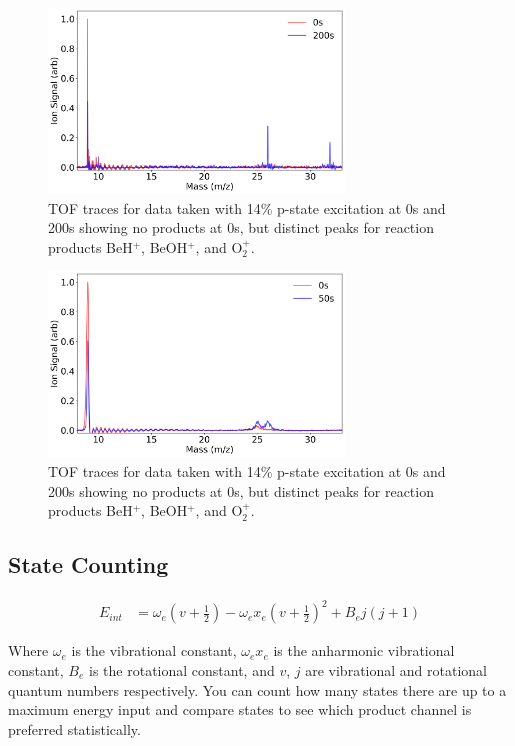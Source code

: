 \documentclass[a4paper]{article}
\begin{document}
\begin{figure}[H]
\centering
\includegraphics[width=0.7\textwidth]{beo_laser_TOF.png}
\caption{\label{fig: laser TOF} TOF traces for data taken with 14\% p-state excitation at 0s and 200s showing no products at 0s, but distinct peaks for reaction products BeH$^+$, BeOH$^+$, and O$_2^+$.}
\end{figure}

\begin{figure}[H]
\centering
\includegraphics[width=0.7\textwidth]{beo_no_laser_TOF.png}
\caption{\label{fig: non laser TOF} TOF traces for data taken with 14\% p-state excitation at 0s and 200s showing no products at 0s, but distinct peaks for reaction products BeH$^+$, BeOH$^+$, and O$_2^+$.}
\end{figure}

\subsection{State Counting}

\begin{align}
E_{int} & = \omega_e\left(v + \frac{1}{2}\right) - \omega_ex_e\left(v+\frac{1}{2}\right)^2 + B_ej(j+1)
\end{align}

Where $\omega_e$ is the vibrational constant, $\omega_ex_e$ is the anharmonic vibrational constant, $B_e$ is the rotational constant, and $v$, $j$ are vibrational and rotational quantum numbers respectively. You can count how many states there are up to a maximum energy input and compare states to see which product channel is preferred statistically.
\end{document}
